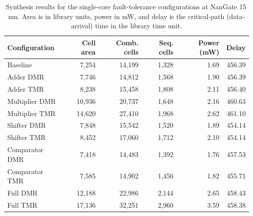 \begin{table}[htbp]
\centering
\caption{Synthesis results for the single-core fault-tolerance configurations at NanGate 15\,nm. Area is in library units, power in mW, and delay is the critical-path (data-arrival) time in the library time unit.}
\label{tab:abs_15nm}
\small
\begin{tabular}{lrrrrr}
\toprule
Configuration & Cell area & Comb. cells & Seq. cells & Power (mW) & Delay \\
\midrule
Baseline & 7,254 & 14,199 & 1,328 & 1.69 & 456.39 \\
Adder DMR & 7,746 & 14,812 & 1,568 & 1.90 & 456.39 \\
Adder TMR & 8,238 & 15,458 & 1,808 & 2.11 & 456.40 \\
Multiplier DMR & 10,936 & 20,737 & 1,648 & 2.16 & 460.63 \\
Multiplier TMR & 14,620 & 27,410 & 1,968 & 2.62 & 461.10 \\
Shifter DMR & 7,848 & 15,542 & 1,520 & 1.89 & 454.14 \\
Shifter TMR & 8,452 & 17,060 & 1,712 & 2.10 & 454.14 \\
Comparator DMR & 7,418 & 14,483 & 1,392 & 1.76 & 457.53 \\
Comparator TMR & 7,585 & 14,902 & 1,456 & 1.82 & 455.71 \\
Full DMR & 12,188 & 22,986 & 2,144 & 2.65 & 458.43 \\
Full TMR & 17,136 & 32,251 & 2,960 & 3.59 & 458.38 \\
\bottomrule
\end{tabular}
\end{table}
